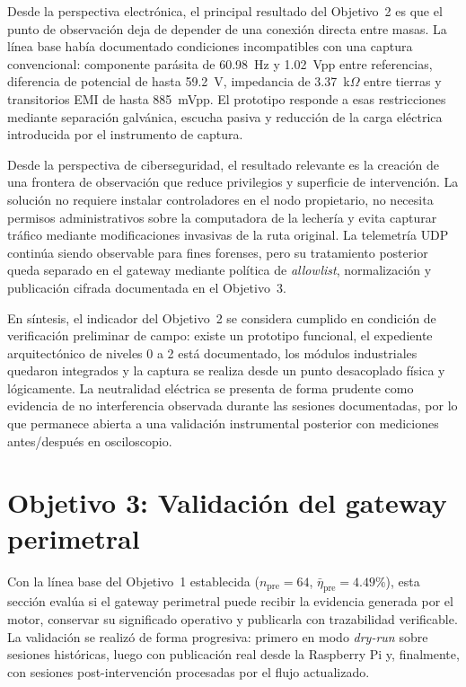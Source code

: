 Desde la perspectiva electrónica, el principal resultado del Objetivo~2 es que el punto de observación deja de depender de una conexión directa entre masas. La línea base había documentado condiciones incompatibles con una captura convencional: componente parásita de 60.98~Hz y 1.02~Vpp entre referencias, diferencia de potencial de hasta 59.2~V, impedancia de 3.37~k$\Omega$ entre tierras y transitorios \ac{EMI} de hasta 885~mVpp. El prototipo responde a esas restricciones mediante separación galvánica, escucha pasiva y reducción de la carga eléctrica introducida por el instrumento de captura.

Desde la perspectiva de ciberseguridad, el resultado relevante es la creación de una frontera de observación que reduce privilegios y superficie de intervención. La solución no requiere instalar controladores en el nodo propietario, no necesita permisos administrativos sobre la computadora de la lechería y evita capturar tráfico mediante modificaciones invasivas de la ruta original. La telemetría \ac{UDP} continúa siendo observable para fines forenses, pero su tratamiento posterior queda separado en el gateway mediante política de \textit{allowlist}, normalización y publicación cifrada documentada en el Objetivo~3.

En síntesis, el indicador del Objetivo~2 se considera cumplido en condición de verificación preliminar de campo: existe un prototipo funcional, el expediente arquitectónico de niveles 0 a 2 está documentado, los módulos industriales quedaron integrados y la captura se realiza desde un punto desacoplado física y lógicamente. La neutralidad eléctrica se presenta de forma prudente como evidencia de no interferencia observada durante las sesiones documentadas, por lo que permanece abierta a una validación instrumental posterior con mediciones antes/después en osciloscopio.

\section{Objetivo 3: Validación del gateway perimetral}
\label{sec:obj3-resultados}

Con la línea base del Objetivo~1 establecida ($n_{\text{pre}}=64$, $\bar{\eta}_{\text{pre}}=4.49\%$), esta sección evalúa si el gateway perimetral puede recibir la evidencia generada por el motor, conservar su significado operativo y publicarla con trazabilidad verificable. La validación se realizó de forma progresiva: primero en modo \textit{dry-run} sobre sesiones históricas, luego con publicación real desde la Raspberry Pi y, finalmente, con sesiones post-intervención procesadas por el flujo actualizado.

